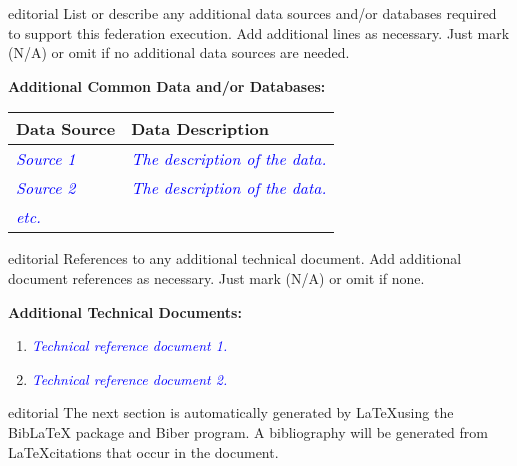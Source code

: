 \documentclass[11pt,english,letterpaper]{article}
\newcommand{\example}[1]{{\textcolor{blue}{\textit{#1}}}}
\begin{document}
\begin{shownto}{editorial}
{\color{red} List or describe any additional data sources and/or databases
required to support this federation execution. Add additional lines as
necessary. Just mark (N/A) or omit if no additional data sources are needed.}
\end{shownto}

\textbf{Additional Common Data and/or Databases: }

\begin{tabularx}{\textwidth}{|l|X|} \hline
\textbf{Data Source} & \textbf{Data Description} \\ \hline
\example{Source 1} & 
\example{The description of the data.} \\ \hline
\example{Source 2} & 
\example{The description of the data.} \\ \hline
\example{etc.} &  \\ \hline
\end{tabularx}

\begin{shownto}{editorial}
{\color{red} References to any additional technical document. Add additional
document references as necessary. Just mark (N/A) or omit if none.}
\end{shownto}

\textbf{Additional Technical Documents: }
\begin{enumerate}
\item \example{Technical reference document 1.}
\item \example{Technical reference document 2.}
\end{enumerate}

\begin{shownto}{editorial}
{\color{red} The next section is automatically generated by \LaTeX using the
BibLaTeX package and Biber program.  A bibliography will be generated from
\LaTeX citations that occur in the document.}
\end{shownto}


\printbibliography
\end{document}
